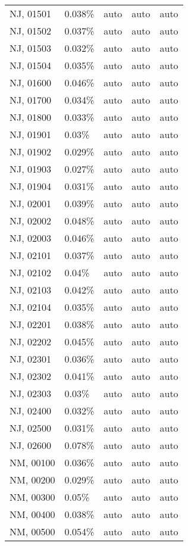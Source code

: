 \begin{longtable}[]{@{}lllll@{}}
NJ, 01501 & 0.038\% & auto & auto & auto \\
NJ, 01502 & 0.037\% & auto & auto & auto \\
NJ, 01503 & 0.032\% & auto & auto & auto \\
NJ, 01504 & 0.035\% & auto & auto & auto \\
NJ, 01600 & 0.046\% & auto & auto & auto \\
NJ, 01700 & 0.034\% & auto & auto & auto \\
NJ, 01800 & 0.033\% & auto & auto & auto \\
NJ, 01901 & 0.03\% & auto & auto & auto \\
NJ, 01902 & 0.029\% & auto & auto & auto \\
NJ, 01903 & 0.027\% & auto & auto & auto \\
NJ, 01904 & 0.031\% & auto & auto & auto \\
NJ, 02001 & 0.039\% & auto & auto & auto \\
NJ, 02002 & 0.048\% & auto & auto & auto \\
NJ, 02003 & 0.046\% & auto & auto & auto \\
NJ, 02101 & 0.037\% & auto & auto & auto \\
NJ, 02102 & 0.04\% & auto & auto & auto \\
NJ, 02103 & 0.042\% & auto & auto & auto \\
NJ, 02104 & 0.035\% & auto & auto & auto \\
NJ, 02201 & 0.038\% & auto & auto & auto \\
NJ, 02202 & 0.045\% & auto & auto & auto \\
NJ, 02301 & 0.036\% & auto & auto & auto \\
NJ, 02302 & 0.041\% & auto & auto & auto \\
NJ, 02303 & 0.03\% & auto & auto & auto \\
NJ, 02400 & 0.032\% & auto & auto & auto \\
NJ, 02500 & 0.031\% & auto & auto & auto \\
NJ, 02600 & 0.078\% & auto & auto & auto \\
NM, 00100 & 0.036\% & auto & auto & auto \\
NM, 00200 & 0.029\% & auto & auto & auto \\
NM, 00300 & 0.05\% & auto & auto & auto \\
NM, 00400 & 0.038\% & auto & auto & auto \\
NM, 00500 & 0.054\% & auto & auto & auto \\

\end{longtable}
